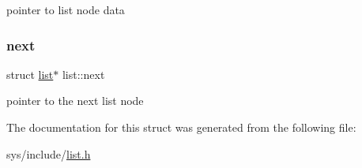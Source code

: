 pointer to list node data \mbox{\label{structlist_a1900fe79e875e2838625b2eb60837f8f}} 
\subsubsection{\texorpdfstring{next}{next}}
{\footnotesize\ttfamily struct \hyperlink{structlist}{list}$\ast$ list\+::next}

pointer to the next list node 

The documentation for this struct was generated from the following file\+:\begin{DoxyCompactItemize}
\item 
sys/include/\hyperlink{list_8h}{list.\+h}\end{DoxyCompactItemize}
